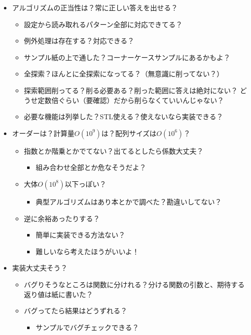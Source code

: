 \documentclass{jsarticle}
\begin{document}
\begin{enumerate}
\begin{itemize}
    \item アルゴリズムの正当性は？常に正しい答えを出せる？
    \begin{itemize}
      \item 設定から読み取れるパターン全部に対応できてる？
      \item 例外処理は存在する？対応できる？
      \item サンプル紙の上で通した？コーナーケースサンプルにあるかもよ？
      \item 全探索？ほんとに全探索になってる？（無意識に削ってない？）
      \item 探索範囲削ってる？削る必要ある？削った範囲に答えは絶対にない？
      \newline どうせ定数倍ぐらい（要確認）だから削らなくていいんじゃない？
      \item 必要な機能は列挙した？STL使える？使えないなら実装できる？
    \end{itemize}
    \item オーダーは？計算量$O(10^9)$は？配列サイズは$O(10^6)$？
    \begin{itemize}
      \item 指数とか階乗とかでてない？出てるとしたら係数大丈夫？
      \begin{itemize}
        \item 組み合わせ全部とか危なそうだよ？
      \end{itemize}
      \item 大体$O(10^8)$以下っぽい？
      \begin{itemize}
        \item 典型アルゴリズムはあり本とかで調べた？勘違いしてない？
      \end{itemize}
      \item 逆に余裕あったりする？
      \begin{itemize}
        \item 簡単に実装できる方法ない？
        \item 難しいなら考えたほうがいいよ！
      \end{itemize}
    \end{itemize}
    \item 実装大丈夫そう？
    \begin{itemize}
      \item バグりそうなところは関数に分けれる？分ける関数の引数と、期待する返り値は紙に書いた？
      \item バグってたら結果はどうずれる？
      \begin{itemize}
        \item サンプルでバグチェックできる？

\end{itemize}
\end{itemize}
\end{itemize}
\end{enumerate}
\end{document}
